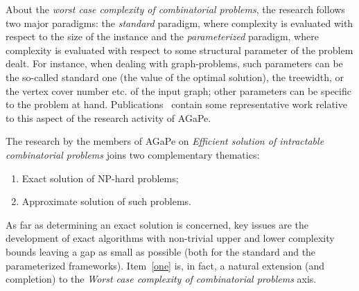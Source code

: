 About the \textit{worst case complexity of combinatorial problems}, the research follows 
two major paradigms: the \textit{standard} paradigm, where complexity is evaluated with respect to the size of the instance and the \textit{parameterized} paradigm, where complexity is evaluated with respect to some structural parameter of the problem dealt. For instance, when dealing with graph-problems, such parameters can be the so-called standard one (the value of the optimal solution), the treewidth, or the vertex cover number etc. of the input graph; other parameters can be specific to the problem at hand.
Publications~\cite{Bazgan2014Parameterized-628151,DBLP:conf/aaim/BazganBCFJKLLMP16,DBLP:journals/algorithmica/BonnetEPT15,Lampis2014The-1298210} contain some representative work relative to this aspect of the research activity of  AGaPe.


The research by the  members of AGaPe on \textit{Efficient solution of intractable combinatorial problems} joins two complementary thematics:
\begin{enumerate}
\item\label{one} Exact solution of NP-hard problems;
\item Approximate solution of such problems.
\end{enumerate}

As far as determining an exact solution is concerned, key issues are
the development of exact algorithms with non-trivial upper and lower complexity bounds 
leaving a gap as small as possible (both for the standard and the parameterized frameworks). Item~\ref{one} is, in fact, a natural extension (and completion) to the \textit{Worst case complexity of combinatorial problems} axis. 


